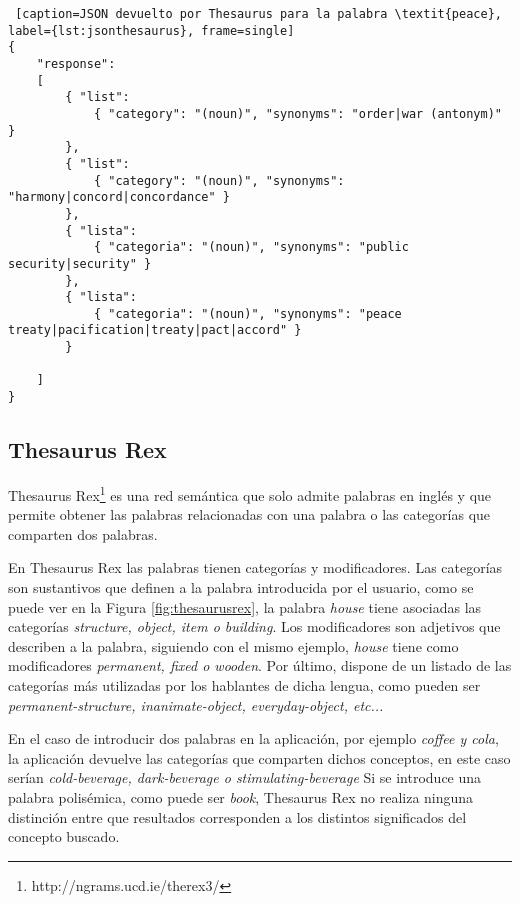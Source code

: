 
\begin{lstlisting} [caption=JSON devuelto por Thesaurus para la palabra \textit{peace}, label={lst:jsonthesaurus}, frame=single]
{
	"response":
	[
		{ "list": 
			{ "category": "(noun)", "synonyms": "order|war (antonym)" }
		},
		{ "list": 
			{ "category": "(noun)", "synonyms": "harmony|concord|concordance" }
		},
		{ "lista": 
			{ "categoria": "(noun)", "synonyms": "public security|security" }
		},
		{ "lista": 
			{ "categoria": "(noun)", "synonyms": "peace treaty|pacification|treaty|pact|accord" }
		}
	
	]
}
\end{lstlisting}




\subsection{Thesaurus Rex}
\label{cap:subsec:thesaurusrex}

Thesaurus Rex\footnote{http://ngrams.ucd.ie/therex3/} es una red semántica que solo admite palabras en inglés y que permite obtener las palabras relacionadas con una palabra o las categorías que comparten dos palabras.

En Thesaurus Rex las palabras tienen categorías y modificadores. Las categorías son sustantivos que definen a la palabra introducida por el usuario, como se puede ver en la Figura \ref{fig:thesaurusrex}, la palabra \textit{house} tiene asociadas las categorías \textit{structure, object, item o building}. Los modificadores son adjetivos que describen a la palabra, siguiendo con el mismo ejemplo, \textit{house} tiene como modificadores \textit{permanent, fixed o wooden}. Por último, dispone de un listado de las categorías más utilizadas por los hablantes de dicha lengua, como pueden ser \textit{permanent-structure, inanimate-object, everyday-object, etc...} 

En el caso de introducir dos palabras en la aplicación, por ejemplo \textit{coffee y cola}, la aplicación devuelve las categorías que comparten dichos conceptos, en este caso serían \textit{cold-beverage, dark-beverage o stimulating-beverage} Si se introduce una palabra polisémica, como puede ser \textit{book}, Thesaurus Rex no realiza ninguna distinción entre que resultados corresponden a los distintos significados del concepto buscado.

